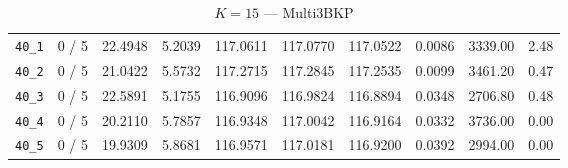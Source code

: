\documentclass{scrartcl}
\begin{document}
\begin{table}[h!]
\begin{center}
\begin{tabular}{| c | c | c | c | c | c | c | c | c | c |}
\verb|40_1| & 0 / 5 & 22.4948 & 5.2039 & 117.0611 & 117.0770 & 117.0522 & 0.0086 & 3339.00 & 2.48\\ 
\verb|40_2| & 0 / 5 & 21.0422 & 5.5732 & 117.2715 & 117.2845 & 117.2535 & 0.0099 & 3461.20 & 0.47\\ 
\verb|40_3| & 0 / 5 & 22.5891 & 5.1755 & 116.9096 & 116.9824 & 116.8894 & 0.0348 & 2706.80 & 0.48\\ 
\verb|40_4| & 0 / 5 & 20.2110 & 5.7857 & 116.9348 & 117.0042 & 116.9164 & 0.0332 & 3736.00 & 0.00\\ 
\verb|40_5| & 0 / 5 & 19.9309 & 5.8681 & 116.9571 & 117.0181 & 116.9200 & 0.0392 & 2994.00 & 0.00\\ 
\hline
\end{tabular}
\caption{$K = 15$ --- Multi3BKP}
\label{table:multi:15}
\end{center}
\end{table}







\end{document}
